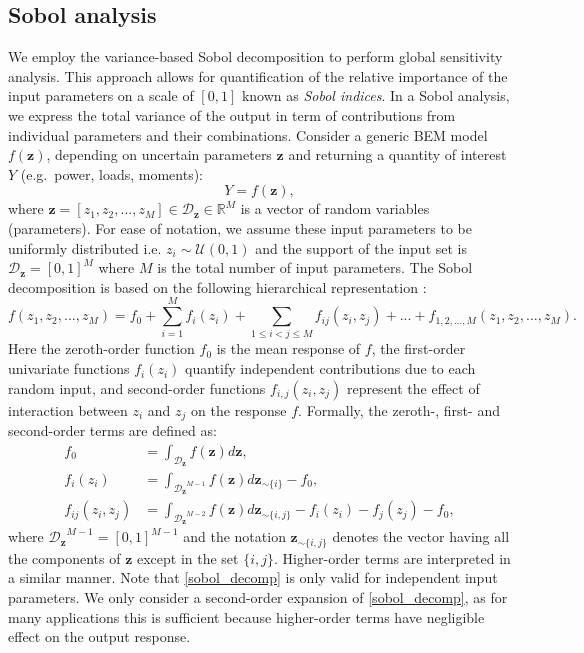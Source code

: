\subsection{Sobol analysis}
We employ the variance-based Sobol decomposition to perform global sensitivity analysis. This approach allows for quantification of the relative importance of the input parameters on a scale of $[0,1]$ known as \emph{Sobol indices}. In a Sobol analysis, we express the total variance of the output in term of contributions from individual parameters and their combinations. Consider a generic BEM model $f(\mathbf{z})$, depending on uncertain parameters $\mathbf{z}$ and returning a quantity of interest $Y$ (e.g.\ power, loads, moments):
\begin{equation}\label{nonlinear_model}
Y = f({\mathbf{z}}),
\end{equation}
where ${\mathbf{z}} = [z_1, z_2, ..., z_M]\in \mathcal{D}_{\mathbf{z}}\in \mathbb{R}^M$ is a vector of random variables (parameters). For ease of notation, we assume these input parameters to be uniformly distributed i.e. $z_i \sim \mathcal{U}(0,1)$ and the support of the input set is $\mathcal{D}_{\mathbf{z}} = [0,1]^M$ where $M$ is the total number of input parameters. The Sobol decomposition is based on the following hierarchical representation \cite{RSmith}:
\begin{equation}\label{sobol_decomp}
f(z_1, z_2, ..., z_M) = f_0+\sum_{i=1}^M f_i(z_i) + \sum_{1\leq i<j\leq M} f_{ij}(z_i,z_j) + ... + f_{1, 2, ..., M}(z_1, z_2, ..., z_M).
\end{equation}
Here the zeroth-order function $f_0$ is the mean response of $f$, the first-order univariate functions $f_i(z_i)$ quantify independent contributions due to each random input, and second-order functions $f_{i,j}(z_i,z_j)$ represent the effect of interaction between $z_i$ and $z_j$ on the response $f$. Formally, the zeroth-, first- and second-order terms are defined as:
\begin{align}\label{sobol_terms}
f_0 &= \int_{\mathcal{D}_{\mathbf{z}}}f(\mathbf{z})d\mathbf{z},\\
f_i(z_i) &= \int_{{\mathcal{D}_{\mathbf{z}}}^{M-1}}f(\mathbf{z})d\mathbf{z}_{\sim \{i\}} - f_0,\\
f_{ij}(z_i,z_j) &= \int_{{\mathcal{D}_{\mathbf{z}}}^{M-2}}f(\mathbf{z})d\mathbf{z}_{\sim \{i,j\}} - f_i(z_i) - f_j(z_j) - f_0,
\end{align}
where ${\mathcal{D}_{\mathbf{z}}}^{M-1} = [0,1]^{M-1}$ and the notation $\mathbf{z}_{\sim \{i,j\}}$ denotes the vector having all the components of $\mathbf{z}$ except in the set $\{i,j\}$. Higher-order terms are interpreted in a similar manner. Note that \eqref{sobol_decomp} is only valid for independent input parameters. We only consider a second-order expansion of \eqref{sobol_decomp}, as for many applications this is sufficient because higher-order terms have negligible effect on the output response. 

